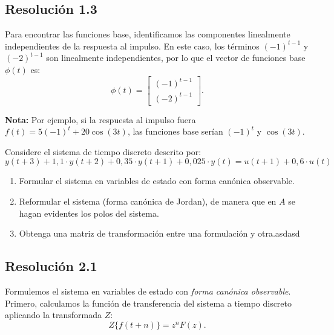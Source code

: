 \documentclass[
  11pt,
  letterpaper,
   addpoints,
  answers
  ]{exam}
\begin{document}
\begin{questions}
\begin{solution}
\subsection*{Resolución 1.3}

Para encontrar las funciones base, identificamos las componentes linealmente independientes de la respuesta al impulso. En este caso, los términos $(-1)^{t-1}$ y $(-2)^{t-1}$ son linealmente independientes, por lo que el vector de funciones base $\phi(t)$ es:
\begin{equation}
\phi(t) = 
\begin{bmatrix}
(-1)^{t-1} \\
(-2)^{t-1}
\end{bmatrix}.
\end{equation}

	\textbf{Nota:} Por ejemplo, si la respuesta al impulso fuera $f(t)=5(-1)^t+20\cos(3t)$, las funciones base serían $(-1)^t$ y $\cos(3t)$.
\end{solution}

  \question Considere el sistema de tiempo discreto descrito por:
\begin{equation*}
  y(t+3) + 1{,}1 \cdot y(t+2) + 0{,}35 \cdot y(t+1) + 0{,}025 \cdot y(t) = u(t+1) + 0{,}6 \cdot u(t)
\end{equation*}
\begin{enumerate}
    \item Formular el sistema en variables de estado con forma canónica observable.
    \item Reformular el sistema (forma canónica de Jordan), de manera que en $A$ se hagan evidentes los polos del sistema.
    \item Obtenga una matriz de transformación entre una formulación y otra.asdasd
\end{enumerate}

\begin{solution}

\subsection*{Resolución 2.1}

Formulemos el sistema en variables de estado con \emph{forma canónica observable}. Primero, calculamos la función de transferencia del sistema a tiempo discreto aplicando la transformada $Z$:
\begin{equation}
Z\{f(t+n)\} = z^n F(z).
\end{equation}


\end{solution}
\end{questions}
\end{document}
